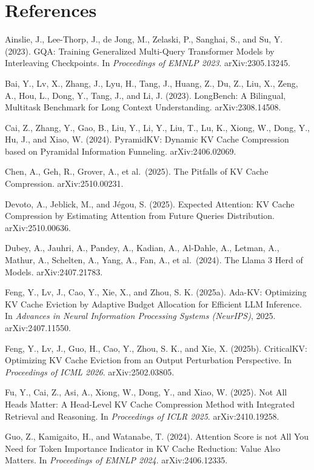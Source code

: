 \documentclass[10pt,letterpaper]{article}
\begin{document}
\hypertarget{references}{%
\section{References}\label{references}}

Ainslie, J., Lee-Thorp, J., de Jong, M., Zelaski, P., Sanghai, S., and
Su, Y. (2023). GQA: Training Generalized Multi-Query Transformer Models
by Interleaving Checkpoints. In \emph{Proceedings of EMNLP 2023}.
arXiv:2305.13245.

Bai, Y., Lv, X., Zhang, J., Lyu, H., Tang, J., Huang, Z., Du, Z., Liu,
X., Zeng, A., Hou, L., Dong, Y., Tang, J., and Li, J. (2023). LongBench:
A Bilingual, Multitask Benchmark for Long Context Understanding.
arXiv:2308.14508.

Cai, Z., Zhang, Y., Gao, B., Liu, Y., Li, Y., Liu, T., Lu, K., Xiong,
W., Dong, Y., Hu, J., and Xiao, W. (2024). PyramidKV: Dynamic KV Cache
Compression based on Pyramidal Information Funneling. arXiv:2406.02069.

Chen, A., Geh, R., Grover, A., et al.~(2025). The Pitfalls of KV Cache
Compression. arXiv:2510.00231.

Devoto, A., Jeblick, M., and Jégou, S. (2025). Expected Attention: KV
Cache Compression by Estimating Attention from Future Queries
Distribution. arXiv:2510.00636.

Dubey, A., Jauhri, A., Pandey, A., Kadian, A., Al-Dahle, A., Letman, A.,
Mathur, A., Schelten, A., Yang, A., Fan, A., et al.~(2024). The Llama 3
Herd of Models. arXiv:2407.21783.

Feng, Y., Lv, J., Cao, Y., Xie, X., and Zhou, S. K. (2025a). Ada-KV:
Optimizing KV Cache Eviction by Adaptive Budget Allocation for Efficient
LLM Inference. In \emph{Advances in Neural Information Processing
Systems (NeurIPS)}, 2025. arXiv:2407.11550.

Feng, Y., Lv, J., Guo, H., Cao, Y., Zhou, S. K., and Xie, X. (2025b).
CriticalKV: Optimizing KV Cache Eviction from an Output Perturbation
Perspective. In \emph{Proceedings of ICML 2026}. arXiv:2502.03805.

Fu, Y., Cai, Z., Asi, A., Xiong, W., Dong, Y., and Xiao, W. (2025). Not
All Heads Matter: A Head-Level KV Cache Compression Method with
Integrated Retrieval and Reasoning. In \emph{Proceedings of ICLR 2025}.
arXiv:2410.19258.

Guo, Z., Kamigaito, H., and Watanabe, T. (2024). Attention Score is not
All You Need for Token Importance Indicator in KV Cache Reduction: Value
Also Matters. In \emph{Proceedings of EMNLP 2024}. arXiv:2406.12335.
\end{document}
